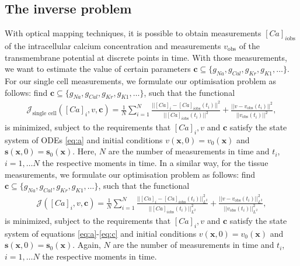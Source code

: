 \documentclass{article}
\begin{document}
\subsection{The inverse problem} \label{The inverse problem}
With optical mapping techniques, it is possible to obtain measurements $[Ca]_{i\text{obs}}$ of the intracellular calcium concentration and measurements $v_{\text{obs}}$ of the transmembrane potential at discrete points in time. With those measurements, we want to estimate the value of certain parameters $\boldsymbol{c}\subseteq \{g_{Na}, g_{Cal}, g_{Kr}, g_{K1}, \ldots \}$. For our single cell measurements, we formulate our optimisation problem as follows: find $\boldsymbol{c} \subseteq\{ g_{Na}, g_{Cal}, g_{Kr}, g_{K1}, \ldots \}$, such that the functional
\begin{eqnarray}
\mathcal{J}_{\text{single cell}}([Ca]_i,v, \boldsymbol{c}) = \frac{1}{N} \sum_{i=1}^{N} \frac{||[Ca]_i-[Ca]_{i\text{obs}}(t_i) ||^2}{||[Ca]_{i\text{obs}}(t_i) ||^2} + \frac{||v-v_{\text{obs}}(t_i)||^2}{||v_{\text{obs}}(t_i)||^2},\label{J_sc}
\end{eqnarray}
is minimized, subject to the requirements that $[Ca]_i, v$ and $\boldsymbol{c}$ satisfy the state system of ODEs \eqref{eq:a} and initial conditions $v(\textbf{x},0)=v_0(\textbf{x})$ and $\mathbf{s}(\mathbf{x},0)=\mathbf{s}_0(\mathbf{x})$. Here, $N$ are the number of measurements in time and $t_i$, $i=1, \dots N$ the respective moments in time. 
In a similar way, for the tissue measurements, we formulate our optimisation problem as follows: find $\boldsymbol{c} \subseteq\{ g_{Na}, g_{Cal}, g_{Kr}, g_{K1}, \ldots \}$, such that the functional
\begin{eqnarray} 
\mathcal{J}([Ca]_i, v, \boldsymbol{c}) = \frac{1}{N} \sum_{i=1}^{N} \frac{||[Ca]_i-[Ca]_{i\text{obs}}(t_i) ||^2_{L^2}}{||[Ca]_{i\text{obs}}(t_i) ||^2_{L^2}} +  \frac{||v-v_{\text{obs}}(t_i)||^2_{L^2}}{||v_{\text{obs}}(t_i)||^2_{L^2}},\label{J}
\end{eqnarray}
is minimized, subject to the requirements that $[Ca]_i, v$ and $\boldsymbol{c}$ satisfy the state system of equations \eqref{eq:a}-\eqref{eq:c} and initial conditions $v(\textbf{x},0)=v_0(\textbf{x})$ and $\mathbf{s}(\mathbf{x},0)=\mathbf{s}_0(\mathbf{x})$. Again, $N$ are the number of measurements in time and $t_i$, $i=1, \dots N$ the respective moments in time. 
%
\end{document}
